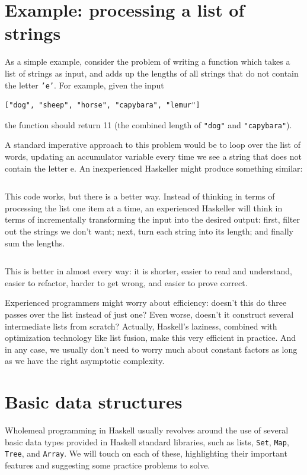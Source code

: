 \documentclass{book}
\newcommand{\h}[1]{\texttt{#1}}
\begin{document}
\section{Example: processing a list of strings}

As a simple example, consider the problem of writing a function which
takes a list of strings as input, and adds up the lengths of all
strings that do not contain the letter \h{'e'}.  For example, given
the input
\begin{verbatim}
["dog", "sheep", "horse", "capybara", "lemur"]
\end{verbatim}
the function should return 11 (the combined length of \h{"dog"} and
\h{"capybara"}).

A standard imperative approach to this problem would be to loop over
the list of words, updating an accumulator variable every time we see
a string that does not contain the letter e.  An inexperienced
Haskeller might produce something similar:
\inputminted{haskell}{code/wholemeal/LengthWithoutE.hs}
This code works, but there is a better way.  Instead of thinking in
terms of processing the list one item at a time, an experienced
Haskeller will think in terms of incrementally transforming the input
into the desired output: first, filter out the strings we don't want;
next, turn each string into its length; and finally sum the lengths.
\inputminted{haskell}{code/wholemeal/LengthWithoutEWholemeal.hs}
This is better in almost every way: it is shorter, easier to read and
understand, easier to refactor, harder to get wrong, and easier to
prove correct.

Experienced programmers might worry about efficiency: doesn't this do
three passes over the list instead of just one?  Even worse, doesn't
it construct several intermediate lists from scratch?  Actually,
Haskell's laziness, combined with optimization technology like list
fusion, make this very efficient in practice.  And in any case, we
usually don't need to worry much about constant factors as long as we
have the right asymptotic complexity.

\section{Basic data structures}

Wholemeal programming in Haskell usually revolves around the use of
several basic data types provided in Haskell standard libraries, such
as lists, \h{Set}, \h{Map}, \h{Tree}, and \h{Array}.  We will touch on
each of these, highlighting their important features and suggesting
some practice problems to solve.
\end{document}
